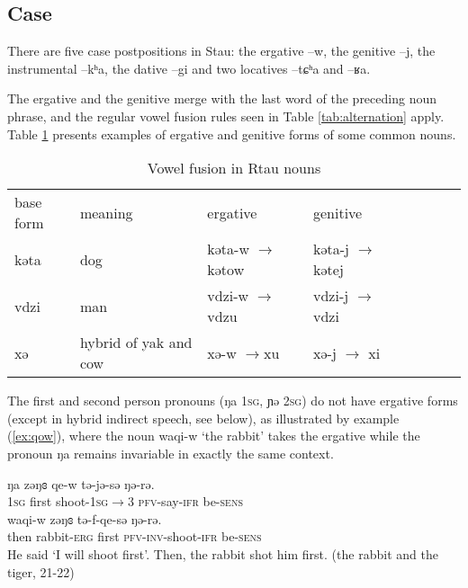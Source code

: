 \documentclass[oneside,a4paper,11pt]{article}
\newcommand{\ipa}[1]{{\phon #1}} %
\begin{document}
\subsection{Case} 
There are five case postpositions in Stau: the ergative \ipa{--w}, the genitive \ipa{--j}, the instrumental \ipa{--kʰa}, the dative \ipa{--gi} and two locatives \ipa{--tɕʰa} and \ipa{--ʁa}.


The ergative and the genitive merge with the last word of the preceding noun phrase, and the regular vowel fusion rules seen in Table \ref{tab:alternation} apply. Table \ref{tab:alternation.noun} presents examples of ergative and genitive forms of some common nouns.

\begin{table}[H]
\caption{Vowel fusion in Rtau nouns} \label{tab:alternation.noun} \centering
\begin{tabular}{l|lllllll}
\toprule
base form & meaning & ergative & genitive \\
\cline{1-4}
\ipa{kəta} & dog & \ipa{kəta-w} $\rightarrow$ \ipa{kətow} & \ipa{kəta-j} $\rightarrow$ \ipa{kətej} & \\
\ipa{vdzi} & man & \ipa{vdzi-w} $\rightarrow$  \ipa{vdzu} & \ipa{vdzi-j} $\rightarrow$ \ipa{vdzi} & \\
\ipa{xə} & hybrid of yak and cow &\ipa{xə-w}  $\rightarrow$\ipa{xu} & \ipa{xə-j} $\rightarrow$ \ipa{xi} & \\
\bottomrule
\end{tabular}
\end{table}

The first and second person pronouns (\ipa{ŋa} \textsc{1sg}, \ipa{ɲə} \textsc{2sg}) do not have ergative forms (except in hybrid indirect speech, see below), as illustrated by example (\ref{ex:qow}), where the noun \ipa{waqi-w}  `the rabbit' takes the ergative while the pronoun \ipa{ŋa} remains invariable in exactly the same context.
 \begin{exe}
\ex \label{ex:qow}
\gll
\ipa{ŋa} 	\ipa{zəŋɞ} 	\ipa{qe-w} \ipa{tə-jə-sə} 	\ipa{ŋə-rə.} \\
\textsc{1sg} first shoot-\textsc{1sg$\rightarrow$3} \textsc{pfv}-say-\textsc{ifr} be-\textsc{sens}\\
\gll \ipa{tɕʰəge,} 	\ipa{waqi-w} 	\ipa{zəŋɞ} 	\ipa{tə-f-qe-sə} 	\ipa{ŋə-rə.} 	\\
then rabbit-\textsc{erg} first \textsc{pfv-inv}-shoot-\textsc{ifr} be-\textsc{sens}\\
\glt He said `I will shoot first'. Then, the rabbit shot him first. (the rabbit and the tiger, 21-22)
\end{exe}
\end{document}
